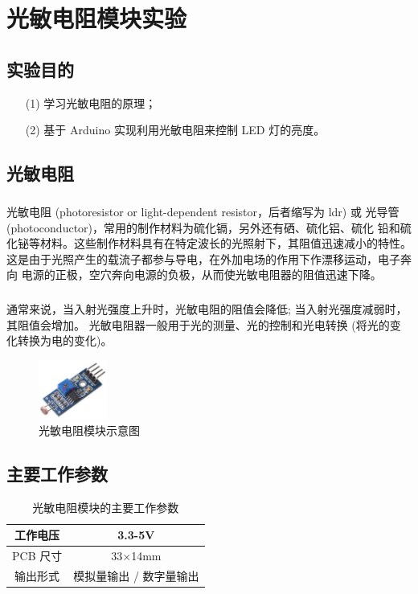 \documentclass[UTF8, oneside]{ctexbook}
\begin{document}
\chapter{光敏电阻模块实验}
\section{实验目的}
\begin{itemize}
    \item[(1)] 学习光敏电阻的原理；
    \item[(2)] 基于 Arduino 实现利用光敏电阻来控制 LED 灯的亮度。
\end{itemize}

\section{光敏电阻}
\paragraph{}
光敏电阻 (photoresistor or light-dependent resistor，后者缩写为 ldr) 或
光导管 (photoconductor)，常用的制作材料为硫化镉，另外还有硒、硫化铝、硫化
铅和硫化铋等材料。这些制作材料具有在特定波长的光照射下，其阻值迅速减小的特性。
这是由于光照产生的载流子都参与导电，在外加电场的作用下作漂移运动，电子奔向
电源的正极，空穴奔向电源的负极，从而使光敏电阻器的阻值迅速下降。

\paragraph{}
通常来说，当入射光强度上升时，光敏电阻的阻值会降低; 当入射光强度减弱时，其阻值会增加。
光敏电阻器一般用于光的测量、光的控制和光电转换 (将光的变化转换为电的变化)。
\begin{figure}[h]
    \centering
    \includegraphics[width=0.2\textwidth]{./result/sensor/8/sensor.png}
    \caption{光敏电阻模块示意图}
    \label{8_sensor}
\end{figure}

\section{主要工作参数}
\begin{table}[h]
    \centering
    \begin{tabular}{|c|c|}
    \hline
    工作电压   & 3.3-5V         \\ \hline
    PCB 尺寸 & 33$\times$14mm \\ \hline
    输出形式   & 模拟量输出 / 数字量输出  \\ \hline
    \end{tabular}
    \caption{光敏电阻模块的主要工作参数}
\end{table}
\end{document}
